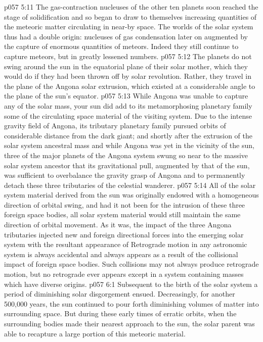 \vs p057 5:11 The gas\hyp{}contraction nucleuses of the other ten planets soon reached the stage of solidification and so began to draw to themselves increasing quantities of the meteoric matter circulating in near-by space. The worlds of the solar system thus had a double origin: nucleuses of gas condensation later on augmented by the capture of enormous quantities of meteors. Indeed they still continue to capture meteors, but in greatly lessened numbers.
\vs p057 5:12 The planets do not swing around the sun in the equatorial plane of their solar mother, which they would do if they had been thrown off by solar revolution. Rather, they travel in the plane of the Angona solar extrusion, which existed at a considerable angle to the plane of the sun’s equator.
\vs p057 5:13 \pc While Angona was unable to capture any of the solar mass, your sun did add to its metamorphosing planetary family some of the circulating space material of the visiting system. Due to the intense gravity field of Angona, its tributary planetary family pursued orbits of considerable distance from the dark giant; and shortly after the extrusion of the solar system ancestral mass and while Angona was yet in the vicinity of the sun, three of the major planets of the Angona system swung so near to the massive solar system ancestor that its gravitational pull, augmented by that of the sun, was sufficient to overbalance the gravity grasp of Angona and to permanently detach these three tributaries of the celestial wanderer.
\vs p057 5:14 All of the solar system material derived from the sun was originally endowed with a homogeneous direction of orbital swing, and had it not been for the intrusion of these three foreign space bodies, all solar system material would still maintain the same direction of orbital movement. As it was, the impact of the three Angona tributaries injected new and foreign directional forces into the emerging solar system with the resultant appearance of  Retrograde motion in any astronomic system is always accidental and always appears as a result of the collisional impact of foreign space bodies. Such collisions may not always produce retrograde motion, but no retrograde ever appears except in a system containing masses which have diverse origins.
\vs p057 6:1 Subsequent to the birth of the solar system a period of diminishing solar disgorgement ensued. Decreasingly, for another 500,000 years, the sun continued to pour forth diminishing volumes of matter into surrounding space. But during these early times of erratic orbits, when the surrounding bodies made their nearest approach to the sun, the solar parent was able to recapture a large portion of this meteoric material.
